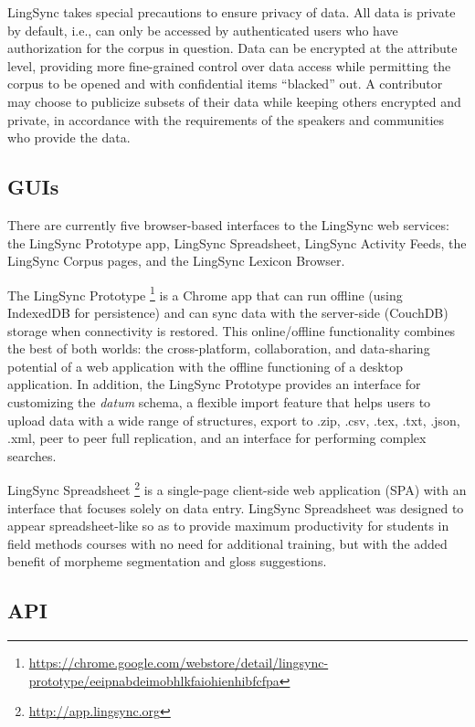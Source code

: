 \documentclass[11pt]{article}
\begin{document}
LingSync takes special precautions to ensure privacy of data. All data is
private by default, i.e., can only be accessed by authenticated users who have
authorization for the corpus in question. Data can be encrypted at the
attribute level, providing more fine-grained control over data access while
permitting the corpus to be opened and with confidential items ``blacked'' out.
A contributor may choose to publicize subsets of their data while keeping
others encrypted and private, in accordance with the requirements of the
speakers and communities who provide the data.


\subsection{GUIs}

There are currently five browser-based interfaces to the LingSync web services:
the LingSync Prototype app, LingSync Spreadsheet, LingSync Activity Feeds, the
LingSync Corpus pages, and the LingSync Lexicon Browser.

The LingSync Prototype%
\footnote{\url{https://chrome.google.com/webstore/detail/lingsync-prototype/eeipnabdeimobhlkfaiohienhibfcfpa}} %
is a Chrome app that can run offline (using IndexedDB for persistence) and can
sync data with the server-side (CouchDB) storage when connectivity is restored.
This online/offline functionality combines the best of both worlds: the
cross-platform, collaboration, and data-sharing potential of a web application
with the offline functioning of a desktop application. In addition, the
LingSync Prototype provides an interface for customizing the \emph{datum}
schema, a flexible import feature that helps users to upload data with a wide
range of structures, export to .zip, .csv, .tex, .txt, .json, .xml, peer to
peer full replication, and an interface for performing complex searches.

LingSync Spreadsheet%
\footnote{\url{http://app.lingsync.org}} %
is a single-page client-side web application (SPA) with an interface that
focuses solely on data entry. LingSync Spreadsheet was designed to appear
spreadsheet-like so as to provide maximum productivity for students in field
methods courses with no need for additional training, but with the added
benefit of morpheme segmentation and gloss suggestions.

\subsection{API}
\end{document}
